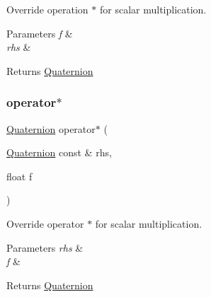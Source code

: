 Override operation $\ast$ for scalar multiplication. 


\begin{DoxyParams}{Parameters}
{\em f} & \\
\hline
{\em rhs} & \\
\hline
\end{DoxyParams}
\begin{DoxyReturn}{Returns}
\hyperlink{structMathUtil_1_1Quaternion}{Quaternion} 
\end{DoxyReturn}
\mbox{\label{structMathUtil_1_1Quaternion_aecdc0f848a93cfe34ca8ca7b31024e27}} 
\subsubsection{\texorpdfstring{operator$\ast$}{operator*}\hspace{0.1cm}{\footnotesize\ttfamily [2/2]}}
{\footnotesize\ttfamily \hyperlink{structMathUtil_1_1Quaternion}{Quaternion} operator$\ast$ (\begin{DoxyParamCaption}\item[{\hyperlink{structMathUtil_1_1Quaternion}{Quaternion} const \&}]{rhs,  }\item[{float}]{f }\end{DoxyParamCaption})\hspace{0.3cm}{\ttfamily [friend]}}



Override operator $\ast$ for scalar multiplication. 


\begin{DoxyParams}{Parameters}
{\em rhs} & \\
\hline
{\em f} & \\
\hline
\end{DoxyParams}
\begin{DoxyReturn}{Returns}
\hyperlink{structMathUtil_1_1Quaternion}{Quaternion} 
\end{DoxyReturn}
\mbox{\label{structMathUtil_1_1Quaternion_af69cd135c1f4ef58d6dd242617108195}} 
